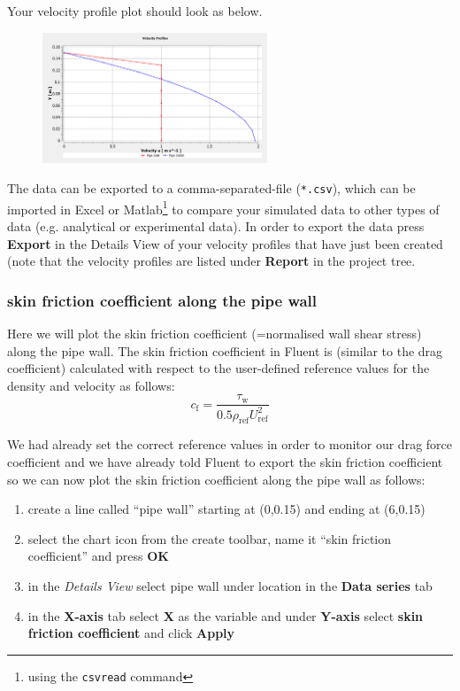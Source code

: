 \documentclass[11pt,a4paper,oneside,hidelinks]{scrartcl}
\newcommand\bfr[1]{\textcolor[rgb]{1,0.00,0.00}{\textbf{\textsf{#1}}}}
\begin{document}
Your velocity profile plot should look as below.
\begin{figure}[H]
\begin{center}
\includegraphics[width=0.6\textwidth,clip]{velocity_profiles.png}
\end{center}
\end{figure}

The data can be exported to a comma-separated-file (\texttt{*.csv}), which can be imported in Excel or Matlab\footnote{using the \texttt{csvread} command} to compare your simulated data to other types of data (e.g. analytical or experimental data). In order to export the data press \bfr{Export} in the Details View of your velocity profiles that have just been created (note that the velocity profiles are listed under  \bfr{Report} in the project tree.

\subsubsection{skin friction coefficient along the pipe wall}

Here we will plot the skin friction coefficient (=normalised wall shear stress) along the pipe wall. The skin friction coefficient in Fluent is (similar to the drag coefficient) calculated with respect to the user-defined reference values for the density and velocity as follows:
\begin{equation}
    c_\mathrm{f}=\frac{\tau_\mathrm{w}}{0.5\rho_\mathrm{ref}U^2_\mathrm{ref}}
\end{equation}

We had already set the correct reference values in order to monitor our drag force coefficient and we have already told Fluent to export the skin friction coefficient so we can now plot the skin friction coefficient along the pipe wall as follows:
\begin{enumerate}
\item create a line called ``pipe wall'' starting at (0,0.15) and ending at (6,0.15)
\item select the chart icon from the create toolbar, name it ``skin friction coefficient'' and press \bfr{OK}
\item in the \emph{Details View} select pipe wall under location in the \bfr{Data series} tab
\item in the \bfr{X-axis} tab select \bfr{X} as the variable and under \bfr{Y-axis} select \bfr{skin friction coefficient} and click \bfr{Apply}
\end{enumerate}
\end{document}
